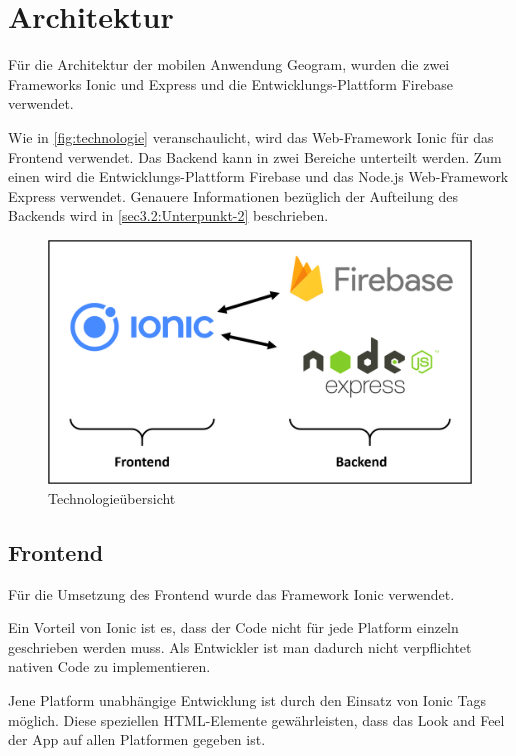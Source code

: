 \chapter{Architektur\label{chap3:Drittes-Kapitel}}

Für die Architektur der mobilen Anwendung \glqq Geogram\grqq{}, wurden die zwei Frameworks \glqq Ionic\grqq{} und \glqq Express\grqq{} und die Entwicklungs-Plattform \glqq Firebase\grqq{} verwendet.

Wie in \autoref{fig:technologie} veranschaulicht, wird das Web-Framework \glqq Ionic\grqq{} für das Frontend verwendet. Das Backend kann in zwei Bereiche unterteilt werden. Zum einen wird die Entwicklungs-Plattform \glqq Firebase\grqq{} und das Node.js Web-Framework \glqq Express\grqq{} verwendet. Genauere Informationen bezüglich der Aufteilung des Backends wird in \autoref{sec3.2:Unterpunkt-2} beschrieben.

\begin{figure}[H]
    \centering
    \includegraphics[width=.8\linewidth]{images/Architektur.png}
    \caption{Technologieübersicht}
    \label{fig:technologie}
\end{figure}

\section{Frontend\label{sec3.1:Unterpunkt-1}}

Für die Umsetzung des Frontend wurde das Framework \glqq Ionic\grqq{} verwendet.

Ein Vorteil von Ionic ist es, dass der Code nicht für jede Platform einzeln geschrieben werden muss. Als Entwickler ist man dadurch nicht verpflichtet nativen Code zu implementieren.

Jene Platform unabhängige Entwicklung ist durch den Einsatz von \glqq Ionic Tags\grqq{} möglich. Diese speziellen HTML-Elemente gewährleisten, dass das \glqq Look and Feel\grqq{} der App auf allen Platformen gegeben ist.

